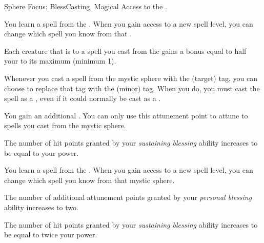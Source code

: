     \begin{feat}{Sphere Focus: Bless}{Casting, Magical}
        \featpre Access to the  .

         You learn a spell from the  .
        When you gain access to a new spell level, you can change which spell you know from that .

         Each creature that is  to a spell you cast from the   gains a bonus equal to half your  to its maximum  (minimum 1).

         Whenever you cast a spell from the  mystic sphere with the  (target) tag, you can choose to replace that tag with the  (minor) tag.
        When you do, you must cast the spell as a , even if it could normally be cast as a .

         You gain an additional .
        You can only use this attunement point to attune to spells you cast from the  mystic sphere.

         The number of hit points granted by your \textit{sustaining blessing} ability increases to be equal to your power.

         You learn a spell from the  .
        When you gain access to a new spell level, you can change which spell you know from that mystic sphere.

         The number of additional attunement points granted by your \textit{personal blessing} ability increases to two.

         The number of hit points granted by your \textit{sustaining blessing} ability increases to be equal to twice your power.
    \end{feat}

